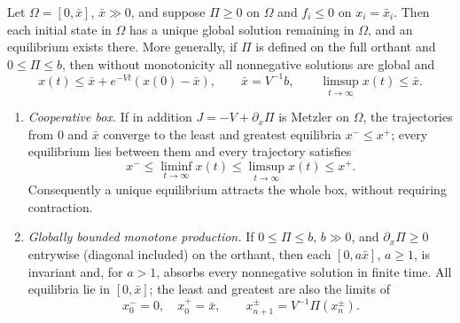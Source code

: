 \label{p:KBwell}
Let $\Omega=[0,\bar x]$, $\bar x\gg0$, and suppose $\Pi\ge0$ on $\Omega$ and
$f_i\le0$ on $x_i=\bar x_i$. Then each initial state in $\Omega$ has a unique
global solution remaining in $\Omega$, and an equilibrium exists there.
More generally, if $\Pi$ is defined on the full orthant and $0\le\Pi\le b$,
then without monotonicity all nonnegative solutions are global and
\[
 x(t)\le\bar x+e^{-Vt}(x(0)-\bar x),\qquad
 \bar x=V^{-1}b,\qquad\limsup_{t\to\infty}x(t)\le\bar x.
\]
\begin{enumerate}
\item[(a)] \emph{Cooperative box.} If in addition $J=-V+\partial_x\Pi$ is
Metzler on $\Omega$, the trajectories from $0$ and $\bar x$
converge to the least and greatest equilibria $x^-\le x^+$; every
equilibrium lies between them and every trajectory satisfies
\[
 x^-\le\liminf_{t\to\infty}x(t)\le\limsup_{t\to\infty}x(t)\le x^+.
\]
Consequently a unique equilibrium attracts the whole box, without
requiring contraction.
\item[(b)] \emph{Globally bounded monotone production.} If $0\le\Pi\le b$,
$b\gg0$, and $\partial_x\Pi\ge0$ entrywise (diagonal included) on the
orthant, then each $[0,a\bar x]$, $a\ge1$, is invariant and, for $a>1$,
absorbs every nonnegative solution in finite time. All equilibria lie in
$[0,\bar x]$; the least and greatest are also the limits of
\[
 x^-_0=0,\quad x^+_0=\bar x,\qquad x^\pm_{n+1}=V^{-1}\Pi(x^\pm_n).
\]
\end{enumerate}
\eeP
